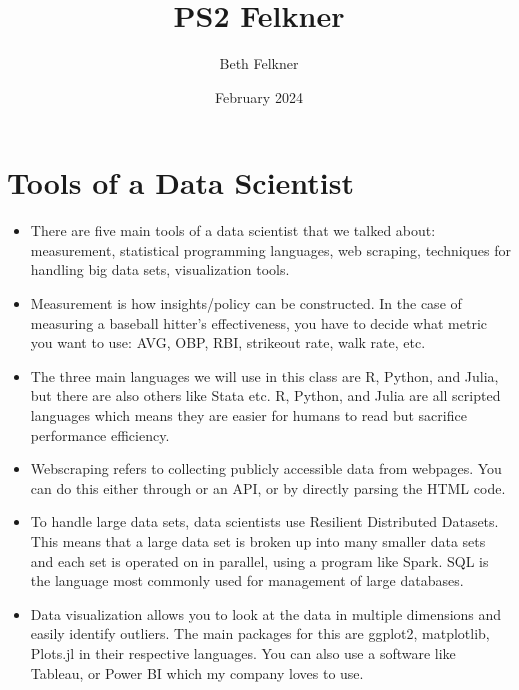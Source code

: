 \documentclass{article}
\title{PS2 Felkner}
\author{Beth Felkner }
\date{February 2024}
\begin{document}
\maketitle

\section{Tools of a Data Scientist}

\begin{itemize}
    \item There are five main tools of a data scientist that we talked about: measurement, statistical programming languages, web scraping, techniques for handling big data sets, visualization tools.

    \item Measurement is how insights/policy can be constructed. In the case of measuring a baseball hitter's effectiveness, you have to decide what metric you want to use: AVG, OBP, RBI, strikeout rate, walk rate, etc. 

    \item The three main languages we will use in this class are R, Python, and Julia, but there are also others like Stata etc. R, Python, and Julia are all scripted languages which means they are easier for humans to read but sacrifice performance efficiency.

    \item Webscraping refers to collecting publicly accessible data from webpages. You can do this either through or an API, or by directly parsing the HTML code.

    \item To handle large data sets, data scientists use Resilient Distributed Datasets. This means that a large data set is broken up into many smaller data sets and each set is operated on in parallel, using a program like Spark. SQL is the language most commonly used for management of large databases. 

    \item Data visualization allows you to look at the data in multiple dimensions and easily identify outliers. The main packages for this are ggplot2, matplotlib, Plots.jl in their respective languages. You can also use a software like Tableau, or Power BI which my company loves to use. 
\end{itemize}
\end{document}
